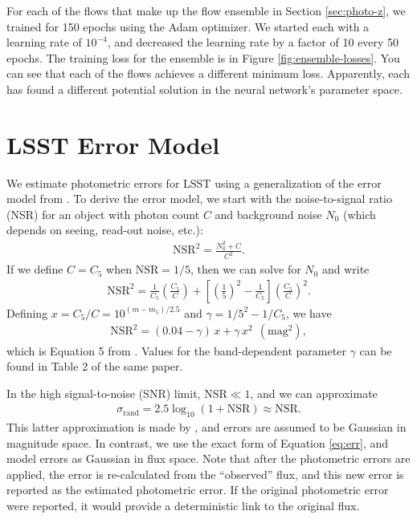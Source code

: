 \documentclass[twocolumn,twocolappendix,linenumbers]{aastex631}
\begin{document}
For each of the flows that make up the flow ensemble in Section \ref{sec:photo-z}, we trained for 150 epochs using the Adam optimizer.
We started each with a learning rate of $10^{-4}$, and decreased the learning rate by a factor of 10 every 50 epochs.
The training loss for the ensemble is in Figure \ref{fig:ensemble-losses}.
You can see that each of the flows achieves a different minimum loss.
Apparently, each has found a different potential solution in the neural network's parameter space.


\section{LSST Error Model}
\label{app:error-model}

We estimate photometric errors for LSST using a generalization of the error model from \citet{ivezic2019}.
To derive the error model, we start with the noise-to-signal ratio (NSR) for an object with photon count $C$ and background noise $N_0$ (which depends on seeing, read-out noise, etc.):
\begin{align}
    \text{NSR}^2 = \frac{N_0^2 + C}{C^2}.
\end{align}
If we define $C=C_5$ when $\text{NSR}= 1/5$, then we can solve for $N_0$ and write
\begin{align}
    \text{NSR}^2 = \frac{1}{C_5} \left( \frac{C_5}{C} \right) + \left[ \left( \frac{1}{5} \right)^2 - \frac{1}{C_5} \right] \left( \frac{C_5}{C} \right)^2.
\end{align}
Defining $x = C_5/C = 10^{(m-m_5)/2.5}$ and $\gamma = 1/5^2 - 1/C_5$, we have
\begin{align}
    \text{NSR}^2 = (0.04 - \gamma) \, x + \gamma \, x^2 ~~ (\text{mag}^2),
\end{align}
which is Equation 5 from \citet{ivezic2019}.
Values for the band-dependent parameter $\gamma$ can be found in Table 2 of the same paper.

In the high signal-to-noise (SNR) limit, $\text{NSR} \ll 1$, and we can approximate
\begin{align}
    \sigma_\text{rand} = 2.5 \log_{10}(1 + \text{NSR}) \approx \text{NSR}.
    \label{eq:err}
\end{align}
This latter approximation is made by \citet{ivezic2019}, and errors are assumed to be Gaussian in magnitude space.
In contrast, we use the exact form of Equation \ref{eq:err}, and model errors as Gaussian in flux space.
Note that after the photometric errors are applied, the error is re-calculated from the ``observed'' flux, and this new error is reported as the estimated photometric error.
If the original photometric error were reported, it would provide a deterministic link to the original flux.
\end{document}
